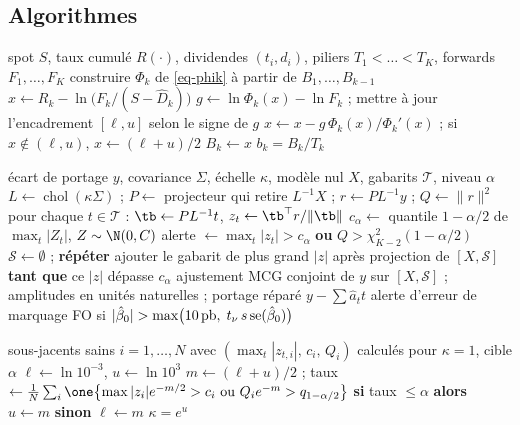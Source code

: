 \subsection{Algorithmes}
\begin{algorithm}[ht]
\caption{Bootstrap du repo implicite}\label{alg-bootstrap}
\begin{algorithmic}[1]
\Require spot $S$, taux cumulé $R(\cdot)$, dividendes $(t_i,d_i)$, piliers $T_1<\dots<T_K$, forwards $F_1,\dots,F_K$
  \State construire $\Phi_k$ de \cref{eq-phik} à partir de $B_1,\dots,B_{k-1}$
  \State $x\gets R_k-\ln\bigl(F_k/(S-\hat D_k)\bigr)$ 
  \Repeat
    \State $g\gets\ln\Phi_k(x)-\ln F_k$ ; mettre à jour l'encadrement $[\ell,u]$ selon le signe de $g$
    \State $x\gets x-g\,\Phi_k(x)/\Phi_k'(x)$ ; si $x\notin(\ell,u)$, $x\gets(\ell+u)/2$
  \State $B_k\gets x$
\EndFor
\State \Return $b_k=B_k/T_k$
\end{algorithmic}
\end{algorithm}

\begin{algorithm}[ht]
\caption{Détection structurelle}\label{alg-detect}
\begin{algorithmic}[1]
\Require écart de portage $y$, covariance $\Sigma$, échelle $\kappa$, modèle nul $X$, gabarits $\mathcal T$, niveau $\alpha$
\State $L\gets\operatorname{chol}(\kappa\Sigma)$ ; $P\gets$ projecteur qui retire $L^{-1}X$ ; $r\gets PL^{-1}y$ ; $Q\gets\|r\|^2$
\State pour chaque $t\in\mathcal T$ : $\tb\gets PL^{-1}t$, $z_t\gets\tb^\top r/\|\tb\|$
\State $c_\alpha\gets$ quantile $1-\alpha/2$ de $\max_t|Z_t|$, $Z\sim\N(0,C)$ 
\State alerte $\gets\max_t|z_t|>c_\alpha$ \textbf{ou} $Q>\chi^2_{K-2}(1-\alpha/2)$
  \State $\mathcal S\gets\emptyset$ ; \textbf{répéter} ajouter le gabarit de plus grand $|z|$ après projection de $[X,\mathcal S]$
  \Statex \hspace{\algorithmicindent} \textbf{tant que} ce $|z|$ dépasse $c_\alpha$
\EndIf
\State ajustement MCG conjoint de $y$ sur $[X,\mathcal S]$ ; amplitudes en unités naturelles ; portage réparé $y-\sum\hat a_tt$
\State alerte d'erreur de marquage FO si $|\hat\beta_0|>\max\bigl(10\text{\,pb},\;t_{\nu}\,s\operatorname{se}(\hat\beta_0)\bigr)$
\end{algorithmic}
\end{algorithm}

\begin{algorithm}[ht]
\caption{Calibration de l'échelle de variance}\label{alg-kappa}
\begin{algorithmic}[1]
\Require sous-jacents sains $i=1,\dots,N$ avec $(\max_t|z_{t,i}|,\,c_i,\,Q_i)$ calculés pour $\kappa=1$, cible $\alpha$
\State $\ell\gets\ln10^{-3}$, $u\gets\ln10^{3}$
  \State $m\gets(\ell+u)/2$ ; taux $\gets\frac1N\sum_i\one\bigl\{\max|z_i|e^{-m/2}>c_i\ \text{ou}\ Q_ie^{-m}>q_{1-\alpha/2}\bigr\}$
  \State \textbf{si} taux $\le\alpha$ \textbf{alors} $u\gets m$ \textbf{sinon} $\ell\gets m$
\EndFor
\State \Return $\kappa=e^{u}$
\end{algorithmic}
\end{algorithm}

